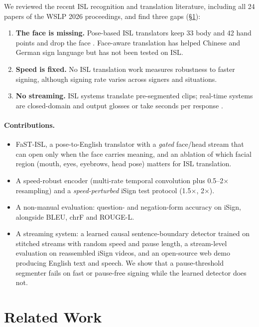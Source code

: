 \documentclass[11pt]{article}
\newcommand{\fast}{FaST-ISL}
\begin{document}
We reviewed the recent ISL recognition and translation literature, including all 24 papers of the WSLP
2026 proceedings, and find three gaps (\S\ref{sec:related}):
\begin{enumerate}
\item \textbf{The face is missing.} Pose-based ISL translators keep 33 body and 42 hand points and drop
  the face \citep{dhamecha2026temporal, ahmed2026islim, shrestha2026contrastive, geetha2025signflow}.
  Face-aware translation has helped Chinese and German sign language \citep{tu2026feaslt} but has not
  been tested on ISL.
\item \textbf{Speed is fixed.} No ISL translation work measures robustness to faster signing, although
  signing rate varies across signers and situations.
\item \textbf{No streaming.} ISL systems translate pre-segmented clips; real-time systems are
  closed-domain and output glosses \citep{geetha2025signflow} or take seconds per response
  \citep{nedungadi2025islca}.
\end{enumerate}

\paragraph{Contributions.}
\begin{itemize}
\item \fast{}, a pose-to-English translator with a \emph{gated} face/head stream that can open only when
  the face carries meaning, and an ablation of which facial region (mouth, eyes, eyebrows, head pose)
  matters for ISL translation.
\item A speed-robust encoder (multi-rate temporal convolution plus 0.5--2$\times$ resampling) and a
  \emph{speed-perturbed} iSign test protocol (1.5$\times$, 2$\times$).
\item A non-manual evaluation: question- and negation-form accuracy on iSign, alongside BLEU, chrF and
  ROUGE-L.
\item A streaming system: a learned causal sentence-boundary detector trained on stitched streams with
  random speed and pause length, a stream-level evaluation on reassembled iSign videos, and an
  open-source web demo producing English text and speech. We show that a pause-threshold segmenter
  fails on fast or pause-free signing while the learned detector does not.
\end{itemize}

\section{Related Work}\label{sec:related}
\end{document}
